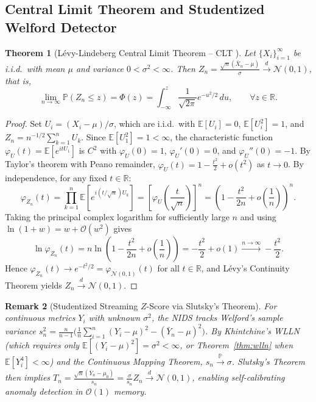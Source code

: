 \documentclass[oneside,noexaminfo,english]{sapthesis}
\numberwithin{equation}{section}
\numberwithin{figure}{section}
\numberwithin{table}{section}
\theoremstyle{compactplain}
\newtheorem{theorem}{Theorem}[section]
\theoremstyle{compactdef}
\theoremstyle{compactrem}
\newtheorem{remark}[theorem]{Remark}
\newcommand{\E}{\mathbb{E}}
\newcommand{\Prob}{\mathbb{P}}
\newcommand{\R}{\mathbb{R}}
\newcommand{\inp}{\overset{\Prob}{\longrightarrow}}
\newcommand{\ind}{\overset{d}{\longrightarrow}}
\begin{document}
\subsection{Central Limit Theorem and Studentized Welford Detector}

\begin{theorem}[L\'evy-Lindeberg Central Limit Theorem -- CLT \cite{billingsley1995}]
\label{thm:clt}
Let $\{X_i\}_{i=1}^\infty$ be i.i.d.\ with mean $\mu$ and variance $0 < \sigma^2 < \infty$. Then $Z_n = \frac{\sqrt{n}(\bar{X}_n - \mu)}{\sigma} \ind \mathcal{N}(0,1)$, that is,
\begin{equation}
    \label{eq:clt}
    \lim_{n \to \infty} \Prob(Z_n \le z) = \Phi(z) = \int_{-\infty}^z \frac{1}{\sqrt{2\pi}} e^{-u^2/2}\,du, \qquad \forall z \in \R.
\end{equation}
\end{theorem}
\begin{proof}
Set $U_i = (X_i - \mu)/\sigma$, which are i.i.d.\ with $\E[U_i] = 0$, $\E[U_i^2] = 1$, and $Z_n = n^{-1/2}\sum_{k=1}^n U_k$. Since $\E[U_1^2] = 1 < \infty$, the characteristic function $\varphi_U(t) = \E[e^{itU_1}]$ is $C^2$ with $\varphi_U(0)=1$, $\varphi_U'(0)=0$, and $\varphi_U''(0)=-1$. By Taylor's theorem with Peano remainder, $\varphi_U(t) = 1 - \frac{t^2}{2} + o(t^2)$ as $t \to 0$. By independence, for any fixed $t \in \R$:
\begin{equation*}
    \varphi_{Z_n}(t) = \prod_{k=1}^n \E\!\left[e^{i(t/\sqrt{n})U_k}\right] = \left[\varphi_U\!\left(\frac{t}{\sqrt{n}}\right)\right]^n = \left(1 - \frac{t^2}{2n} + o\!\left(\frac{1}{n}\right)\right)^n.
\end{equation*}
Taking the principal complex logarithm for sufficiently large $n$ and using $\ln(1+w) = w + \mathcal{O}(w^2)$ gives
\begin{equation*}
    \ln \varphi_{Z_n}(t) = n\ln\!\left(1 - \frac{t^2}{2n} + o\!\left(\frac{1}{n}\right)\right) = -\frac{t^2}{2} + o(1) \xrightarrow{n\to\infty} -\frac{t^2}{2}.
\end{equation*}
Hence $\varphi_{Z_n}(t) \to e^{-t^2/2} = \varphi_{\mathcal{N}(0,1)}(t)$ for all $t \in \R$, and L\'evy's Continuity Theorem \cite{billingsley1995} yields $Z_n \ind \mathcal{N}(0,1)$.
\end{proof}

\begin{remark}[Studentized Streaming $Z$-Score via Slutsky's Theorem]
For continuous metrics $Y_i$ with unknown $\sigma^2$, the NIDS tracks Welford's sample variance $s_n^2 = \frac{n}{n-1}\bigl(\frac{1}{n}\sum_{i=1}^n (Y_i - \mu)^2 - (\bar{Y}_n - \mu)^2\bigr)$. By Khintchine's WLLN (which requires only $\E[(Y_i-\mu)^2] = \sigma^2 < \infty$, or Theorem~\ref{thm:wlln} when $\E[Y_i^4] < \infty$) and the Continuous Mapping Theorem, $s_n \inp \sigma$. Slutsky's Theorem \cite{billingsley1995} then implies $T_n = \frac{\sqrt{n}(\bar{Y}_n - \mu_0)}{s_n} = \frac{\sigma}{s_n} Z_n \ind \mathcal{N}(0,1)$, enabling self-calibrating anomaly detection in $\mathcal{O}(1)$ memory.
\end{remark}
\end{document}
